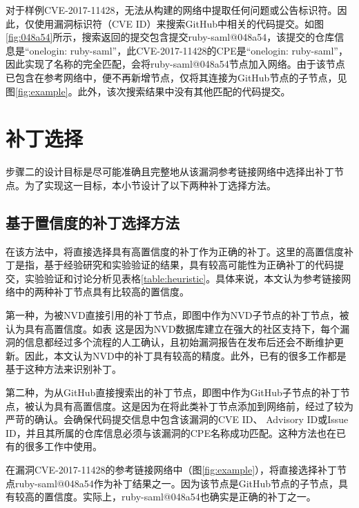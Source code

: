 \begin{exmp}
对于样例CVE-2017-11428，\tool 无法从构建的网络中提取任何问题或公告标识符。因此，\tool 仅使用漏洞标识符（CVE ID）来搜索GitHub中相关的代码提交。如图\ref{fig:048a54}所示，搜索返回的提交包含提交ruby-saml@048a54，该提交的仓库信息是“onelogin: ruby-saml”，此CVE-2017-11428的CPE是“onelogin: ruby-saml”，因此实现了名称的完全匹配，\tool 会将ruby-saml@048a54节点加入网络。由于该节点已包含在参考网络中，\tool 便不再新增节点，仅将其连接为GitHub节点的子节点，见图\ref{fig:example}。此外，该次搜索结果中没有其他匹配的代码提交。
\end{exmp}   

\section{补丁选择}\label{sec:selection}

步骤二的设计目标是尽可能准确且完整地从该漏洞参考链接网络中选择出补丁节点。为了实现这一目标，本小节设计了以下两种补丁选择方法。

\subsection{基于置信度的补丁选择方法}
在该方法中，\tool 将直接选择具有高置信度的补丁作为正确的补丁。这里的高置信度补丁是指，基于经验研究和实验验证的结果，具有较高可能性为正确补丁的代码提交，实验验证和讨论分析见表格\ref{table:heuristic}。具体来说，本文认为参考链接网络中的两种补丁节点具有比较高的置信度。

第一种，为被NVD直接引用的补丁节点，即图中作为NVD子节点的补丁节点，被认为具有高置信度。如表 这是因为NVD数据库建立在强大的社区支持下，每个漏洞的信息都经过多个流程的人工确认，且初始漏洞报告在发布后还会不断维护更新。因此，本文认为NVD中的补丁具有较高的精度。此外，已有的很多工作\cite{duan2019automating, li2016vulpecker, li2018vuldeepecker}都是基于这种方法来识别补丁。

第二种，为从GitHub直接搜索出的补丁节点，即图中作为GitHub子节点的补丁节点，被认为具有高置信度。这是因为在将此类补丁节点添加到网络前，经过了较为严苛的确认。\tool 会确保代码提交信息中包含该漏洞的CVE ID、 Advisory ID或Issue ID，并且其所属的仓库信息必须与该漏洞的CPE名称成功匹配。这种方法也在已有的很多工作\cite{you2017semfuzz, Wang2020empirical}中使用。

\begin{exmp}
在漏洞CVE-2017-11428的参考链接网络中（图\ref{fig:example}），\tool 将直接选择补丁节点ruby-saml@048a54作为补丁结果之一。因为该节点是GitHub节点的子节点，具有较高的置信度。实际上，ruby-saml@048a54也确实是正确的补丁之一。
\end{exmp}

